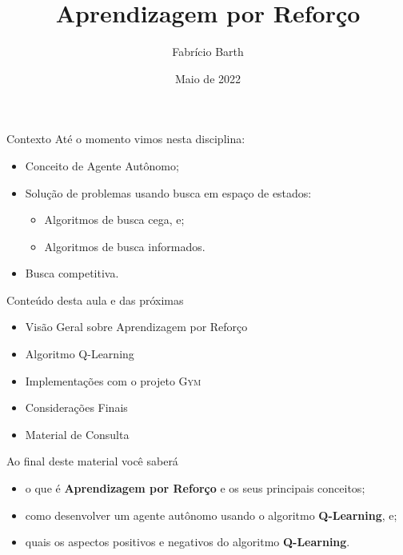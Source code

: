\documentclass{beamer}
\begin{document}
\title{Aprendizagem por Reforço} 
\author{Fabrício Barth}
\date{Maio de 2022}

\maketitle

\begin{frame}{Contexto}
Até o momento vimos nesta disciplina:
\begin{itemize}
	\item Conceito de Agente Autônomo;
	\item Solução de problemas usando busca em espaço de estados:
	\begin{itemize}
		\item Algoritmos de busca cega, e;
		\item Algoritmos de busca informados.
	\end{itemize}
	\item Busca competitiva.
\end{itemize}
\end{frame}

\begin{frame}{Conteúdo desta aula e das próximas}
  \begin{itemize}
\item Visão Geral sobre Aprendizagem por Reforço
\item Algoritmo Q-Learning
\item Implementações com o projeto \textsc{Gym}
\item Considerações Finais
\item Material de Consulta
  \end{itemize}
\end{frame}

\begin{frame}{Ao final deste material você saberá}

	\begin{itemize}
	\item o que é \textbf{Aprendizagem por Reforço} e os seus principais conceitos;
	\item como desenvolver um agente autônomo usando o algoritmo \textbf{Q-Learning}, e;
	\item quais os aspectos positivos e negativos do algoritmo \textbf{Q-Learning}.
	\end{itemize}

\end{frame}
\end{document}
